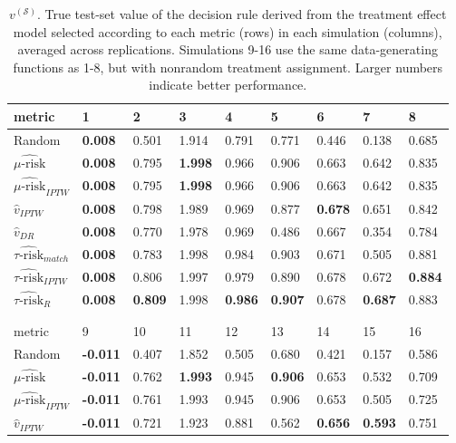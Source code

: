\begin{table}[h!t]
\centering
\caption{$v^{(\mathcal{S})}$. True test-set value of the decision rule derived from the treatment effect model selected according to each metric (rows) in each simulation (columns), averaged across replications. Simulations 9-16 use the same data-generating functions as 1-8, but with nonrandom treatment assignment. Larger numbers indicate better performance.}
\begin{tabular}{lllllllll}
  \hline
metric & 1 & 2 & 3 & 4 & 5 & 6 & 7 & 8 \\ 
  \hline
Random & \bfseries{0.008} & 0.501 & 1.914 & 0.791 & 0.771 & 0.446 & 0.138 & 0.685 \\ 
  $\widehat{\mu\text{-risk}}$ & \bfseries{0.008} & 0.795 & \bfseries{1.998} & 0.966 & 0.906 & 0.663 & 0.642 & 0.835 \\ 
  $\widehat{\mu\text{-risk}}_{IPTW}$ & \bfseries{0.008} & 0.795 & \bfseries{1.998} & 0.966 & 0.906 & 0.663 & 0.642 & 0.835 \\ 
  $\hat v_{IPTW}$ & \bfseries{0.008} & 0.798 & 1.989 & 0.969 & 0.877 & \bfseries{0.678} & 0.651 & 0.842 \\ 
  $\hat v_{DR}$ & \bfseries{0.008} & 0.770 & 1.978 & 0.969 & 0.486 & 0.667 & 0.354 & 0.784 \\ 
  $\widehat{\tau\text{-risk}}_{match}$ & \bfseries{0.008} & 0.783 & 1.998 & 0.984 & 0.903 & 0.671 & 0.505 & 0.881 \\ 
  $\widehat{\tau\text{-risk}}_{IPTW}$ & \bfseries{0.008} & 0.806 & 1.997 & 0.979 & 0.890 & 0.678 & 0.672 & \bfseries{0.884} \\ 
  $\widehat{\tau\text{-risk}}_{R}$ & \bfseries{0.008} & \bfseries{0.809} & 1.998 & \bfseries{0.986} & \bfseries{0.907} & 0.678 & \bfseries{0.687} & 0.883 \\ 
  \hline
   \\
  \\
  \hline
metric & 9 & 10 & 11 & 12 & 13 & 14 & 15 & 16 \\ 
  \hline
Random & \bfseries{-0.011} & 0.407 & 1.852 & 0.505 & 0.680 & 0.421 & 0.157 & 0.586 \\ 
  $\widehat{\mu\text{-risk}}$ & \bfseries{-0.011} & 0.762 & \bfseries{1.993} & 0.945 & \bfseries{0.906} & 0.653 & 0.532 & 0.709 \\ 
  $\widehat{\mu\text{-risk}}_{IPTW}$ & \bfseries{-0.011} & 0.761 & 1.993 & 0.945 & 0.906 & 0.653 & 0.505 & 0.725 \\ 
  $\hat v_{IPTW}$ & \bfseries{-0.011} & 0.721 & 1.923 & 0.881 & 0.562 & \bfseries{0.656} & \bfseries{0.593} & 0.751 \\ 

\end{tabular}
\end{table}
